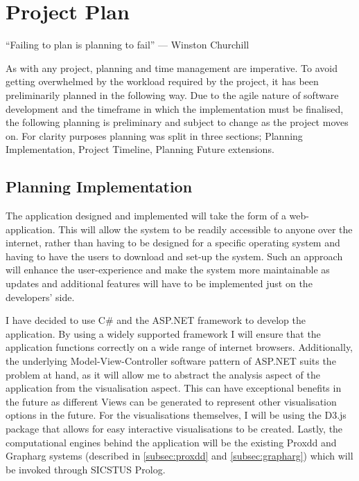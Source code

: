 \newpage
\chapter{Project Plan}
``Failing to plan is planning to fail'' --- Winston Churchill
\newline

As with any project, planning and time management are imperative. To avoid getting overwhelmed by the workload required by the project, it has been preliminarily planned in the following way. Due to the agile nature of software development and the timeframe in which the implementation must be finalised, the following planning is preliminary and subject to change as the project moves on. For clarity purposes planning was split in three sections; Planning Implementation, Project Timeline, Planning Future extensions.


\section{Planning Implementation}
The application designed and implemented will take the form of a web-application. This will allow the system to be readily accessible to anyone over the internet, rather than having to be designed for a specific operating system and having to have the users to download and set-up the system. Such an approach will enhance the user-experience and make the system more maintainable as updates and additional features will have to be implemented just on the developers' side. 

I have decided to use C\# and the ASP.NET framework to develop the application. By using a widely supported framework I will ensure that the application functions correctly on a wide range of internet browsers. Additionally, the underlying Model-View-Controller software pattern of ASP.NET suits the problem at hand, as it will allow me to abstract the analysis aspect of the application from the visualisation aspect. This can have exceptional benefits in the future as different Views can be generated to represent other visualisation options in the future. For the visualisations themselves, I will be using the D3.js package that allows for easy interactive visualisations to be created. Lastly, the computational engines behind the application will be the existing Proxdd and Grapharg systems (described in \cref{subsec:proxdd} and \cref{subsec:grapharg})  which will be invoked through SICSTUS Prolog.

